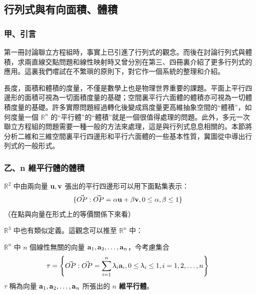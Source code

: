 \subsection{行列式與有向面積、體積}\label{sec:b6s-1-2}
\resetsectcounters

\subsubsection*{甲、引言}\label{subsec:b6s-1-2-a}

第一冊討論聯立方程組時，事實上已引進了行列式的觀念。而後在討論行列式與體積，求兩直線交點問題和線性映射時又曾分別在第三、四冊裏介紹了更多行列式的應用。這裏我們嚐試在不繁瑣的原則下，對它作一個系統的整理和介紹。

長度，面積和體積的度量，不僅是數學上也是物理世界重要的課題。平面上平行四邊形的面積可視為一切面積度量的基礎；空間裏平行六面體的體積亦可視為一切體積度量的基礎。許多實際問題經過轉化後變成爲度量更高維抽象空間的“體積”，如何度量一個 $\mathbb{R}^n$ 的“平行體”的“體積”就是一個很值得處理的問題。此外，多元一次聯立方程組的問題需要一種一般的方法來處理，這是與行列式息息相關的。本節將分析二維和三維空間裏平行四邊形和平行六面體的一些基本性質，冀圖從中導出行列式的一般形式。

\subsubsection*{乙、n 維平行體的體積}\label{subsec:b6s-1-2-b}

$\mathbb{R}^2$ 中由兩向量 $\boldsymbol{\mathbf{u}}, \boldsymbol{\mathbf{v}}$ 張出的平行四邊形可以用下面點集表示：
\begin{equation}
\{ \vec{OP} : \vec{OP} = \alpha\boldsymbol{\mathbf{u}} + \beta\boldsymbol{\mathbf{v}}, 0 \le \alpha, \beta \le 1 \} \label{eq:b6s-1-2-1}
\end{equation}
（在點與向量在形式上的等價關係下來看）

$\mathbb{R}^3$ 中也有類似定義。這觀念可以推至 $\mathbb{R}^n$ 中：

\begin{definition}\label{def:b6s-1-4}
$\mathbb{R}^n$ 中 $n$ 個線性無關的向量 $\boldsymbol{\mathbf{a}}_1, \boldsymbol{\mathbf{a}}_2, \dots, \boldsymbol{\mathbf{a}}_n$，今考慮集合
\begin{equation}
\tau = \left\{ \vec{OP} : \vec{OP} = \sum_{i=1}^n \uplambda_i \boldsymbol{\mathbf{a}}_i, 0 \le \uplambda_i \le 1, i=1, 2, \dots, n \right\} \label{eq:b6s-1-2-2}
\end{equation}
$\tau$ 稱為向量 $\boldsymbol{\mathbf{a}}_1, \boldsymbol{\mathbf{a}}_2, \dots, \boldsymbol{\mathbf{a}}_n$ 所張出的 \textbf{$n$ 維平行體}。
\end{definition}

